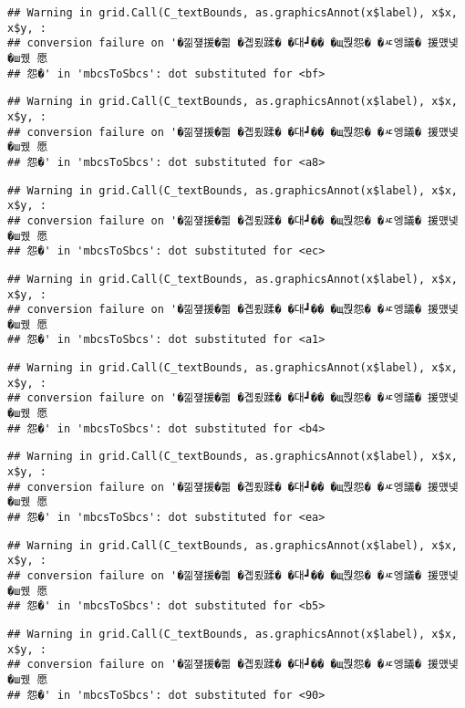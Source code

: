 \documentclass[
]{article}
\begin{document}
\begin{verbatim}
## Warning in grid.Call(C_textBounds, as.graphicsAnnot(x$label), x$x, x$y, :
## conversion failure on '�낆쟾援�쁾 �곕룄蹂� �대┛�� �щ쭩怨� �ㅼ엥議� 援먰넻�ш퀬 愿
## 怨�' in 'mbcsToSbcs': dot substituted for <bf>
\end{verbatim}

\begin{verbatim}
## Warning in grid.Call(C_textBounds, as.graphicsAnnot(x$label), x$x, x$y, :
## conversion failure on '�낆쟾援�쁾 �곕룄蹂� �대┛�� �щ쭩怨� �ㅼ엥議� 援먰넻�ш퀬 愿
## 怨�' in 'mbcsToSbcs': dot substituted for <a8>
\end{verbatim}

\begin{verbatim}
## Warning in grid.Call(C_textBounds, as.graphicsAnnot(x$label), x$x, x$y, :
## conversion failure on '�낆쟾援�쁾 �곕룄蹂� �대┛�� �щ쭩怨� �ㅼ엥議� 援먰넻�ш퀬 愿
## 怨�' in 'mbcsToSbcs': dot substituted for <ec>
\end{verbatim}

\begin{verbatim}
## Warning in grid.Call(C_textBounds, as.graphicsAnnot(x$label), x$x, x$y, :
## conversion failure on '�낆쟾援�쁾 �곕룄蹂� �대┛�� �щ쭩怨� �ㅼ엥議� 援먰넻�ш퀬 愿
## 怨�' in 'mbcsToSbcs': dot substituted for <a1>
\end{verbatim}

\begin{verbatim}
## Warning in grid.Call(C_textBounds, as.graphicsAnnot(x$label), x$x, x$y, :
## conversion failure on '�낆쟾援�쁾 �곕룄蹂� �대┛�� �щ쭩怨� �ㅼ엥議� 援먰넻�ш퀬 愿
## 怨�' in 'mbcsToSbcs': dot substituted for <b4>
\end{verbatim}

\begin{verbatim}
## Warning in grid.Call(C_textBounds, as.graphicsAnnot(x$label), x$x, x$y, :
## conversion failure on '�낆쟾援�쁾 �곕룄蹂� �대┛�� �щ쭩怨� �ㅼ엥議� 援먰넻�ш퀬 愿
## 怨�' in 'mbcsToSbcs': dot substituted for <ea>
\end{verbatim}

\begin{verbatim}
## Warning in grid.Call(C_textBounds, as.graphicsAnnot(x$label), x$x, x$y, :
## conversion failure on '�낆쟾援�쁾 �곕룄蹂� �대┛�� �щ쭩怨� �ㅼ엥議� 援먰넻�ш퀬 愿
## 怨�' in 'mbcsToSbcs': dot substituted for <b5>
\end{verbatim}

\begin{verbatim}
## Warning in grid.Call(C_textBounds, as.graphicsAnnot(x$label), x$x, x$y, :
## conversion failure on '�낆쟾援�쁾 �곕룄蹂� �대┛�� �щ쭩怨� �ㅼ엥議� 援먰넻�ш퀬 愿
## 怨�' in 'mbcsToSbcs': dot substituted for <90>
\end{verbatim}
\end{document}
